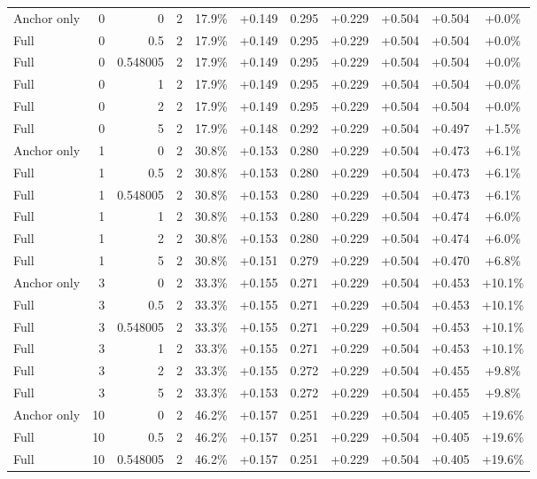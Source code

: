\begin{table}[htbp]
\begin{tabular}{lrrrccccccc}
Anchor only & 0 & 0 & 2 & 17.9\% & +0.149 & 0.295 & +0.229 & +0.504 & +0.504 & +0.0\% \\
Full & 0 & 0.5 & 2 & 17.9\% & +0.149 & 0.295 & +0.229 & +0.504 & +0.504 & +0.0\% \\
Full & 0 & 0.548005 & 2 & 17.9\% & +0.149 & 0.295 & +0.229 & +0.504 & +0.504 & +0.0\% \\
Full & 0 & 1 & 2 & 17.9\% & +0.149 & 0.295 & +0.229 & +0.504 & +0.504 & +0.0\% \\
Full & 0 & 2 & 2 & 17.9\% & +0.149 & 0.295 & +0.229 & +0.504 & +0.504 & +0.0\% \\
Full & 0 & 5 & 2 & 17.9\% & +0.148 & 0.292 & +0.229 & +0.504 & +0.497 & +1.5\% \\
Anchor only & 1 & 0 & 2 & 30.8\% & +0.153 & 0.280 & +0.229 & +0.504 & +0.473 & +6.1\% \\
Full & 1 & 0.5 & 2 & 30.8\% & +0.153 & 0.280 & +0.229 & +0.504 & +0.473 & +6.1\% \\
Full & 1 & 0.548005 & 2 & 30.8\% & +0.153 & 0.280 & +0.229 & +0.504 & +0.473 & +6.1\% \\
Full & 1 & 1 & 2 & 30.8\% & +0.153 & 0.280 & +0.229 & +0.504 & +0.474 & +6.0\% \\
Full & 1 & 2 & 2 & 30.8\% & +0.153 & 0.280 & +0.229 & +0.504 & +0.474 & +6.0\% \\
Full & 1 & 5 & 2 & 30.8\% & +0.151 & 0.279 & +0.229 & +0.504 & +0.470 & +6.8\% \\
Anchor only & 3 & 0 & 2 & 33.3\% & +0.155 & 0.271 & +0.229 & +0.504 & +0.453 & +10.1\% \\
Full & 3 & 0.5 & 2 & 33.3\% & +0.155 & 0.271 & +0.229 & +0.504 & +0.453 & +10.1\% \\
Full & 3 & 0.548005 & 2 & 33.3\% & +0.155 & 0.271 & +0.229 & +0.504 & +0.453 & +10.1\% \\
Full & 3 & 1 & 2 & 33.3\% & +0.155 & 0.271 & +0.229 & +0.504 & +0.453 & +10.1\% \\
Full & 3 & 2 & 2 & 33.3\% & +0.155 & 0.272 & +0.229 & +0.504 & +0.455 & +9.8\% \\
Full & 3 & 5 & 2 & 33.3\% & +0.153 & 0.272 & +0.229 & +0.504 & +0.455 & +9.8\% \\
Anchor only & 10 & 0 & 2 & 46.2\% & +0.157 & 0.251 & +0.229 & +0.504 & +0.405 & +19.6\% \\
Full & 10 & 0.5 & 2 & 46.2\% & +0.157 & 0.251 & +0.229 & +0.504 & +0.405 & +19.6\% \\
Full & 10 & 0.548005 & 2 & 46.2\% & +0.157 & 0.251 & +0.229 & +0.504 & +0.405 & +19.6\% \\

\end{tabular}
\end{table}
